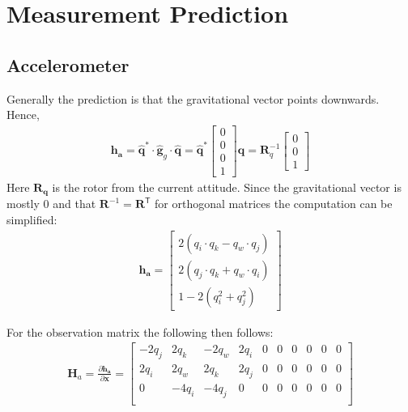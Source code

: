 \documentclass[10pt,a4paper]{article}
\newcommand{\M}[1]{\mathbf{#1}}
\newcommand{\V}[1]{\mathbf{#1}}
\newcommand{\Vh}[1]{\mathbf{\hat{#1}}}
\begin{document}
\section{Measurement Prediction}

\subsection{Accelerometer}
Generally the prediction is that the gravitational vector points downwards.
Hence,
\begin{align}
  \V {h_a} = \Vh q^* \cdot \Vh g_g \cdot \Vh q = \Vh q^*
  \begin{bmatrix}
    0 \\ 0 \\ 0 \\ 1
  \end{bmatrix} \Vh q = \M R_q^{-1 }
\begin{bmatrix}
    0 \\ 0 \\ 1
  \end{bmatrix}
\end{align}
Here $\M {R_q}$ is the rotor from the current attitude.
Since the gravitational vector is mostly 0 and that $\M R^{-1} = \M R^{\mathsf {T}}$ for orthogonal matrices the computation can be simplified:
\begin{align}
  \V {h_a} = \begin{bmatrix}
    2 (q_i \cdot q_k - q_w \cdot q_j) \\
    2 (q_j \cdot q_k + q_w \cdot q_i) \\
    1 - 2 (q_i^2 + q_j^2)
  \end{bmatrix}
\end{align}

For the observation matrix the following then follows:
\begin{align}
 \M H_a =  \frac { \partial \V {h_a}}  {\partial \V x}  =
  \begin{bmatrix}
    - 2 q_j & 2 q_k & - 2 q_w & 2 q_i & 0 & 0 & 0 & 0 & 0 & 0 \\
    2 q_i & 2 q_w &  2 q_k & 2 q_j & 0 & 0 & 0 & 0 & 0 & 0 \\
    0 & - 4 q_i & - 4 q_j & 0 & 0 & 0 & 0 & 0 & 0 & 0 \\
  \end{bmatrix}
\end{align}
\end{document}
